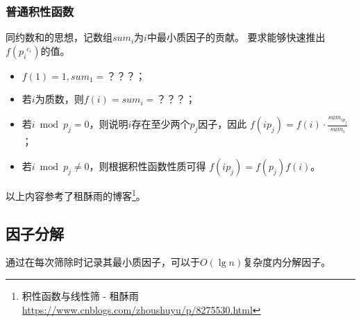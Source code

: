 \subsubsection{普通积性函数}
同约数和的思想，记数组$sum_i$为$i$中最小质因子的贡献。
要求能够快速推出$f({p_i}^{c_i})$的值。
\begin{itemize}
	\item $f(1)=1,sum_1=？？？$；
	\item 若$i$为质数，则$f(i)=sum_i=？？？$；
	\item 若$i \bmod p_j=0$，则说明$i$存在至少两个$p_j$因子，因此
	      $f(ip_j)=f(i)\cdot\frac{sum_{ip_j}}{sum_i}$；
	\item 若$i \bmod p_j\neq 0$，则根据积性函数性质可得
	      $f(ip_j)=f(p_j)f(i)$。
\end{itemize}
以上内容参考了租酥雨的博客\footnote{积性函数与线性筛 - 租酥雨
	\url{https://www.cnblogs.com/zhoushuyu/p/8275530.html}}。
\subsection{因子分解}
通过在每次筛除时记录其最小质因子，可以于$O(\lg n)$复杂度内分解因子。
